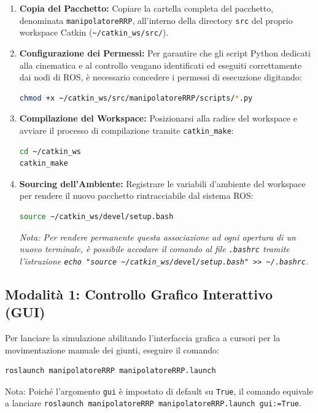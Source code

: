 \documentclass[11pt, a4paper]{report}
\begin{document}
\begin{enumerate}
    \item \textbf{Copia del Pacchetto:} Copiare la cartella completa del pacchetto, denominata \texttt{manipolatoreRRP}, all'interno della directory \texttt{src} del proprio workspace Catkin (\texttt{\textasciitilde/catkin\_ws/src/}).

    \item \textbf{Configurazione dei Permessi:} Per garantire che gli script Python dedicati alla cinematica e al controllo vengano identificati ed eseguiti correttamente dai nodi di ROS, è necessario concedere i permessi di esecuzione digitando:
    \begin{lstlisting}[language=bash]
chmod +x ~/catkin_ws/src/manipolatoreRRP/scripts/*.py
    \end{lstlisting}

    \item \textbf{Compilazione del Workspace:} Posizionarsi alla radice del workspace e avviare il processo di compilazione tramite \texttt{catkin\_make}:
    \begin{lstlisting}[language=bash]
cd ~/catkin_ws
catkin_make
    \end{lstlisting}

    \item \textbf{Sourcing dell'Ambiente:} Registrare le variabili d'ambiente del workspace per rendere il nuovo pacchetto rintracciabile dal sistema ROS:
    \begin{lstlisting}[language=bash]
source ~/catkin_ws/devel/setup.bash
    \end{lstlisting}
    \textit{Nota: Per rendere permanente questa associazione ad ogni apertura di un nuovo terminale, è possibile accodare il comando al file \texttt{.bashrc} tramite l'istruzione \texttt{echo "source \textasciitilde/catkin\_ws/devel/setup.bash" >> \textasciitilde/.bashrc}.}
\end{enumerate}

\newpage
\subsection{Modalità 1: Controllo Grafico Interattivo (GUI)}
Per lanciare la simulazione abilitando l'interfaccia grafica a cursori per la movimentazione manuale dei giunti, eseguire il comando:
\begin{lstlisting}[language=bash]
roslaunch manipolatoreRRP manipolatoreRRP.launch
\end{lstlisting}
Nota: Poiché l'argomento \texttt{gui} è impostato di default su \texttt{True}, il comando equivale a lanciare \texttt{roslaunch manipolatoreRRP manipolatoreRRP.launch gui:=True}.
\end{document}
